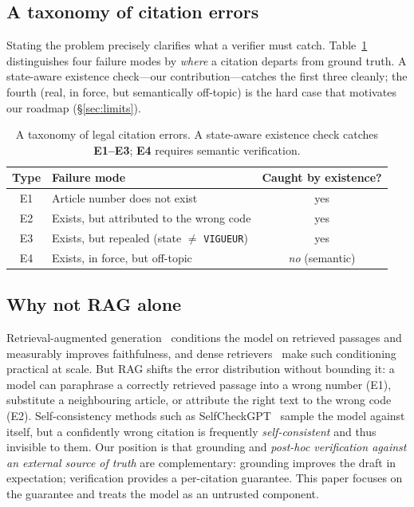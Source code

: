 \subsection{A taxonomy of citation errors}
\label{sec:taxonomy}
Stating the problem precisely clarifies what a verifier must catch.
Table~\ref{tab:taxonomy} distinguishes four failure modes by \emph{where} a
citation departs from ground truth. A state-aware existence check---our
contribution---catches the first three cleanly; the fourth (real, in force, but
semantically off-topic) is the hard case that motivates our roadmap
(\S\ref{sec:limits}).

\begin{table}[t]
\centering
\caption{A taxonomy of legal citation errors. A state-aware existence check
catches \textbf{E1--E3}; \textbf{E4} requires semantic verification.}
\label{tab:taxonomy}
\small
\begin{tabular}{@{}clc@{}}
\toprule
Type & Failure mode & Caught by existence? \\
\midrule
E1 & Article number does not exist & yes \\
E2 & Exists, but attributed to the wrong code & yes \\
E3 & Exists, but repealed (state $\neq$ \texttt{VIGUEUR}) & yes \\
E4 & Exists, in force, but off-topic & \emph{no} (semantic) \\
\bottomrule
\end{tabular}
\end{table}

\subsection{Why not RAG alone}
Retrieval-augmented generation~\cite{lewis2020rag, gao2023ragsurvey} conditions
the model on retrieved passages and measurably improves faithfulness, and dense
retrievers~\cite{karpukhin2020dpr} make such conditioning practical at scale.
But RAG shifts the error distribution without bounding it: a model can
paraphrase a correctly retrieved passage into a wrong number (E1), substitute a
neighbouring article, or attribute the right text to the wrong code (E2).
Self-consistency methods such as SelfCheckGPT~\cite{manakul2023selfcheckgpt}
sample the model against itself, but a confidently wrong citation is frequently
\emph{self-consistent} and thus invisible to them. Our position is that
grounding and \emph{post-hoc verification against an external source of truth}
are complementary: grounding improves the draft in expectation; verification
provides a per-citation guarantee. This paper focuses on the guarantee and
treats the model as an untrusted component.


